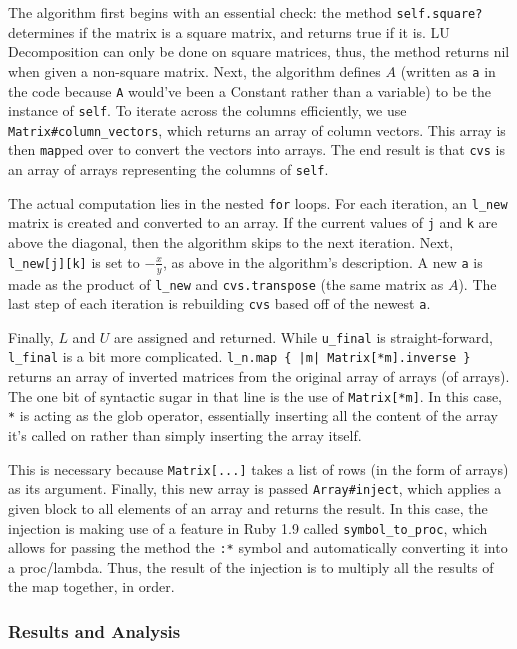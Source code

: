\documentclass[letterpaper,12pt]{article}
\begin{document}
The algorithm first begins with an essential check: the method
\texttt{self.square?} determines if the matrix is a square matrix, and returns
true if it is.
LU Decomposition can only be done on square matrices, thus, the method returns
nil when given a non-square matrix.
Next, the algorithm defines $A$ (written as \texttt{a} in the code because
\texttt{A} would've been a Constant rather than a variable) to be the instance
of \texttt{self}.
To iterate across the columns efficiently, we use
\texttt{Matrix\#column\_vectors}, which returns an array of column vectors.
This array is then \texttt{map}ped over to convert the vectors into arrays.
The end result is that \texttt{cvs} is an array of arrays representing the
columns of \texttt{self}.

The actual computation lies in the nested \texttt{for} loops.
For each iteration, an \texttt{l\_new} matrix is created and converted to an
array.
If the current values of \texttt{j} and \texttt{k} are above the diagonal,
then the algorithm skips to the next iteration.
Next, \texttt{l\_new[j][k]} is set to $-\frac{x}{y}$, as above in the
algorithm's description.
A new \texttt{a} is made as the product of \texttt{l\_new} and
\texttt{cvs.transpose} (the same matrix as $A$).
The last step of each iteration is rebuilding \texttt{cvs} based off of the
newest \texttt{a}.

Finally, $L$ and $U$ are assigned and returned.
While \texttt{u\_final} is straight-forward, \texttt{l\_final} is a bit more
complicated.
\texttt{l\_n.map \{ |m| Matrix[*m].inverse \}} returns an array of inverted
matrices from the original array of arrays (of arrays).
The one bit of syntactic sugar in that line is the use of \texttt{Matrix[*m]}.
In this case, \texttt{*} is acting as the glob operator, essentially inserting
all the content of the array it's called on rather than simply inserting the
array itself.

This is necessary because \texttt{Matrix[...]} takes a list of rows (in the
form of arrays) as its argument.
Finally, this new array is passed \texttt{Array\#inject}, which applies a given
block to all elements of an array and returns the result.
In this case, the injection is making use of a feature in Ruby 1.9 called
\texttt{symbol\_to\_proc}, which allows for passing the method the \texttt{:*}
symbol and automatically converting it into a proc/lambda.
Thus, the result of the injection is to multiply all the results of the map
together, in order.

\subsubsection{Results and Analysis}
\end{document}
